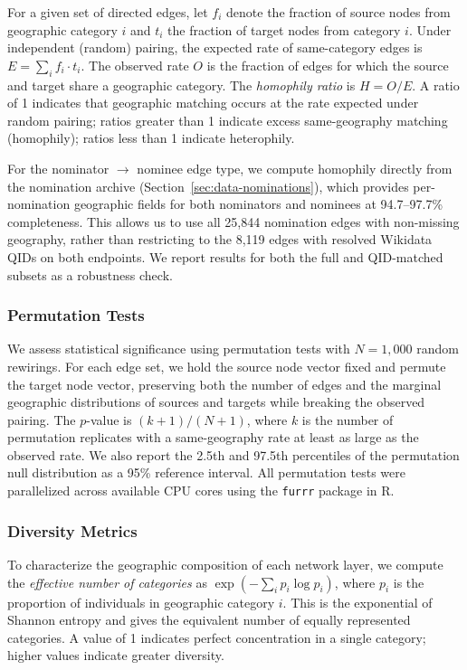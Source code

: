 \documentclass[11pt]{article}
\begin{document}
For a given set of directed edges, let $f_i$ denote the fraction of source nodes from geographic category $i$ and $t_i$ the fraction of target nodes from category $i$. Under independent (random) pairing, the expected rate of same-category edges is $E = \sum_i f_i \cdot t_i$. The observed rate $O$ is the fraction of edges for which the source and target share a geographic category. The \emph{homophily ratio} is $H = O / E$. A ratio of 1 indicates that geographic matching occurs at the rate expected under random pairing; ratios greater than 1 indicate excess same-geography matching (homophily); ratios less than 1 indicate heterophily.

For the nominator $\to$ nominee edge type, we compute homophily directly from the nomination archive (Section~\ref{sec:data-nominations}), which provides per-nomination geographic fields for both nominators and nominees at 94.7--97.7\% completeness. This allows us to use all 25{,}844 nomination edges with non-missing geography, rather than restricting to the 8{,}119 edges with resolved Wikidata QIDs on both endpoints. We report results for both the full and QID-matched subsets as a robustness check.

\subsubsection{Permutation Tests}

We assess statistical significance using permutation tests with $N = 1{,}000$ random rewirings. For each edge set, we hold the source node vector fixed and permute the target node vector, preserving both the number of edges and the marginal geographic distributions of sources and targets while breaking the observed pairing. The $p$-value is $(k + 1) / (N + 1)$, where $k$ is the number of permutation replicates with a same-geography rate at least as large as the observed rate. We also report the 2.5th and 97.5th percentiles of the permutation null distribution as a 95\% reference interval. All permutation tests were parallelized across available CPU cores using the \texttt{furrr} package in R.

\subsubsection{Diversity Metrics}

To characterize the geographic composition of each network layer, we compute the \emph{effective number of categories} as $\exp(-\sum_i p_i \log p_i)$, where $p_i$ is the proportion of individuals in geographic category $i$. This is the exponential of Shannon entropy and gives the equivalent number of equally represented categories. A value of 1 indicates perfect concentration in a single category; higher values indicate greater diversity.
\end{document}
